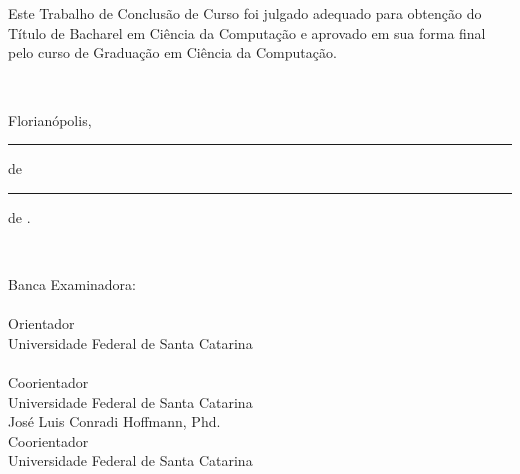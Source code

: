 \documentclass[
    12pt,
    oneside,
    a4paper,
    chapter=TITLE,
    section=TITLE,
    english,
    brazil
]{abntex2}
\newcommand{\coorientadordois}{José Luis Conradi Hoffmann, Phd.}
\begin{document}
\begin{folhadeaprovacao}
\centering
{\fontsize{12}{14}\selectfont \imprimirautor}\\[1cm]
{\fontsize{14}{16}\selectfont\bfseries \imprimirtitulo}\\[2cm]

\begin{minipage}{0.85\textwidth}
\fontsize{12}{14}\selectfont
\SingleSpacing
Este Trabalho de Conclusão de Curso foi julgado adequado para obtenção do
Título de Bacharel em Ciência da Computação e aprovado em sua forma final
pelo curso de Graduação em Ciência da Computação.
\end{minipage}\\[1.5cm]

{\fontsize{12}{14}\selectfont Florianópolis, \rule{2cm}{0.4pt} de
\rule{3.5cm}{0.4pt} de \imprimirdata.}\\[2cm]

\begin{center}
\fontsize{12}{14}\selectfont
Banca Examinadora:\\[1.5cm]

\imprimirorientador\\
Orientador\\
Universidade Federal de Santa Catarina\\[1cm]

\imprimircoorientador\\
Coorientador\\
Universidade Federal de Santa Catarina\\[1cm]

\coorientadordois\\
Coorientador\\
Universidade Federal de Santa Catarina
\end{center}
\end{folhadeaprovacao}
\end{document}
